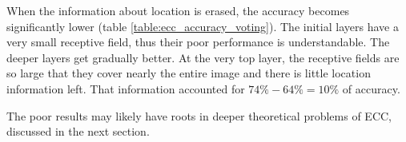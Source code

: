\documentclass[12pt]{article}
\begin{document}
\begin{table}[]
	\caption{The same architecture as in table \ref{table:ecc_accuracy_slow} but the classification head no longer has access to neuron location information}
	\label{table:ecc_accuracy_voting}
\end{table}
When the information about location is erased, the accuracy becomes significantly lower (table \ref{table:ecc_accuracy_voting}). The initial layers have a very small receptive field, thus their poor performance is understandable. The deeper layers get gradually better. At the very top layer, the receptive fields are so large that they cover nearly the entire image and there is little location information left. That information accounted for $74\%-64\%=10\%$ of accuracy. 

The poor results may likely have roots in deeper theoretical problems of ECC, discussed in the next section.
\end{document}
